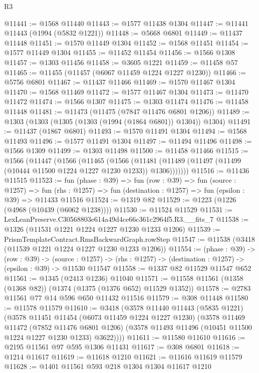 \begin{lexlean}{R3}
\begin{coremodule}
@11441 := @1568 @11440
@11443 := @1577 @11438 @1304
@11447 := @11441 @11443 (@1994 (@5832 @1221))
@11448 := @5668 @6801
@11449 := @11437 @11448
@11451 := @1570 @11449 @1304
@11452 := @1568 @11451
@11454 := @1577 @11449 @1304
@11455 := @11452 @11454
@11456 := @1566 @1308
@11457 := @1303 @11456
@11458 := @3605 @1221
@11459 := @11458 @57
@11465 := @11455 (@11457 (@6067 @11459 @1224 @1227 @1230))
@11466 := @5756 @6801
@11467 := @11437 @11466
@11469 := @1570 @11467 @1304
@11470 := @1568 @11469
@11472 := @1577 @11467 @1304
@11473 := @11470 @11472
@11474 := @1566 @1307
@11475 := @1303 @11474
@11476 := @11458 @11448
@11481 := @11473 (@11475 (@7847 @11476 @6801 @1206))
@11489 := @1303 (@1303 (@1305 (@1303 (@1994 (@1864 @6801)) @1304)) @1304)
@11491 := @11437 (@1867 @6801)
@11493 := @1570 @11491 @1304
@11494 := @1568 @11493
@11496 := @1577 @11491 @1304
@11497 := @11494 @11496
@11498 := @1566 @1309
@11499 := @1303 @11498
@11500 := @11458 @11466
@11515 := @1566
    (@11447
      (@1566
        (@11465
          (@1566
            (@11481 (@11489 (@11497 (@11499 (@10444 @11500 @1224 @1227 @1230 @1233)) @1306)))))))
@11516 := @11436 @11515
@11523 := fun (phase : @39) =>
  fun (row : @39) =>
  fun (source : @1257) =>
  fun (rhs : @1257) => fun (destination : @1257) => fun (epsilon : @39) => @11433 @11516
@11524 := @1319 @82
@11529 := @1223 (@1226 (@4968 (@10439 (@6062 @1238))))
@11530 := @11524 @11529
@11531 := LexLeanPreserve.C30568803e614a49d4ce66c361c2964f5.R3.__fits_7
@11538 := @1326 (@11531 @1221 @1224 @1227 @1230 @1233 @1206)
@11539 := PrismTemplateContract.RmsBackwardGraph.rowStep
@11547 := @11538 (@3418 (@11539 @1221 @1224 @1227 @1230 @1233 @1206))
@11554 := (phase : @39) ->
  (row : @39) ->
  (source : @1257) -> (rhs : @1257) -> (destination : @1257) -> (epsilon : @39) -> @11530 @11547
@11558 := @1337 @82 @11529 @11547 @652
@11561 := @1345 (@2413 @1236) @11040
@11571 := @11558 @11561 (@1358 (@1368 @82)) (@1374 (@1375 (@1376 @652) @11529 @1352))
@11578 := @2783 @11561 @77 @14 @596 @650 @11432 @11516
@11579 := @308 @11448
@11580 := @11578 @11579
@11610 := @3418
    (@3578
      @11440
      @11443
      (@5835 @1221)
      (@3578
        @11451
        @11454
        (@6073 @11459 @1224 @1227 @1230)
        (@3578
          @11469
          @11472
          (@7852 @11476 @6801 @1206)
          (@3578 @11493 @11496 (@10451 @11500 @1224 @1227 @1230 @1233) @3622))))
@11611 := @11580 @11610
@11616 := @2195 @11561 @97 @595 @1306 @11431
@11617 := @308 @6801
@11618 := @1214 @11617
@11619 := @11618 @1210
@11621 := @11616 @11619 @11579
@11628 := @1401 @11561 @593 @218 @1304 @1304 @11617 @1210

\end{coremodule}
\end{lexlean}

